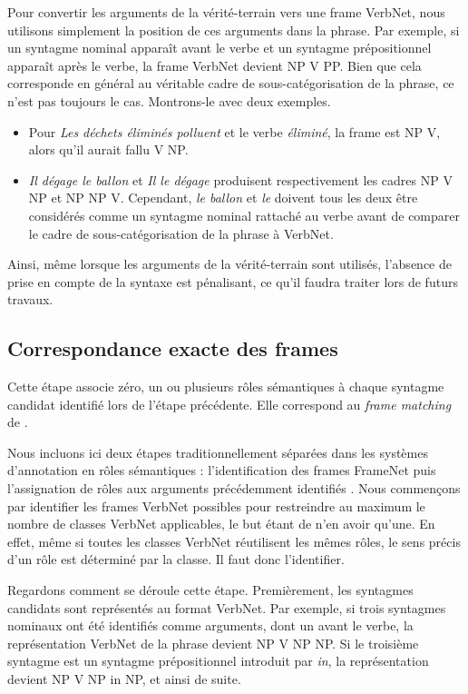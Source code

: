 Pour convertir les arguments de la vérité-terrain vers une frame VerbNet, nous
utilisons simplement la position de ces arguments dans la phrase. Par exemple,
si un syntagme nominal apparaît avant le verbe et un syntagme prépositionnel
apparaît après le verbe, la frame VerbNet devient NP V PP. Bien que cela
corresponde en général au véritable cadre de sous-catégorisation de la phrase,
ce n'est pas toujours le cas. Montrons-le avec deux exemples.

\begin{itemize}
    \item Pour \textit{Les déchets éliminés polluent} et le verbe
        \textit{éliminé}, la frame est NP V, alors qu'il aurait fallu V NP.
    \item \textit{Il dégage le ballon} et \textit{Il le dégage} produisent
        respectivement les cadres NP V NP et NP NP V. Cependant, \textit{le
        ballon} et \textit{le} doivent tous les deux être considérés comme un
        syntagme nominal rattaché au verbe avant de comparer le cadre de
        sous-catégorisation de la phrase à VerbNet.
\end{itemize}

Ainsi, même lorsque les arguments de la vérité-terrain sont utilisés, l'absence
de prise en compte de la syntaxe est pénalisant, ce qu'il faudra traiter lors
de futurs travaux.

\subsection{Correspondance exacte des frames}
\label{correspondance_exacte}

Cette étape associe zéro, un ou plusieurs rôles sémantiques à chaque syntagme
candidat identifié lors de l'étape précédente. Elle correspond au \textit{frame
matching} de \citet{swier2005exploiting}.

Nous incluons ici deux étapes traditionnellement séparées dans les systèmes
d'annotation en rôles sémantiques : l'identification des frames FrameNet puis
l'assignation de rôles aux arguments précédemment identifiés
\citep{gildea2002automatic,das2014frame}. Nous commençons par identifier les
frames VerbNet possibles pour restreindre au maximum le nombre de classes
VerbNet applicables, le but étant de n'en avoir qu'une. En effet, même si
toutes les classes VerbNet réutilisent les mêmes rôles, le sens précis d'un
rôle est déterminé par la classe. Il faut donc l'identifier.

Regardons comment se déroule cette étape. Premièrement, les syntagmes candidats
sont représentés au format VerbNet. Par exemple, si trois syntagmes nominaux
ont été identifiés comme arguments, dont un avant le verbe, la représentation
VerbNet de la phrase devient NP V NP NP. Si le troisième syntagme est un
syntagme prépositionnel introduit par \textit{in}, la représentation devient NP
V NP in NP, et ainsi de suite.

